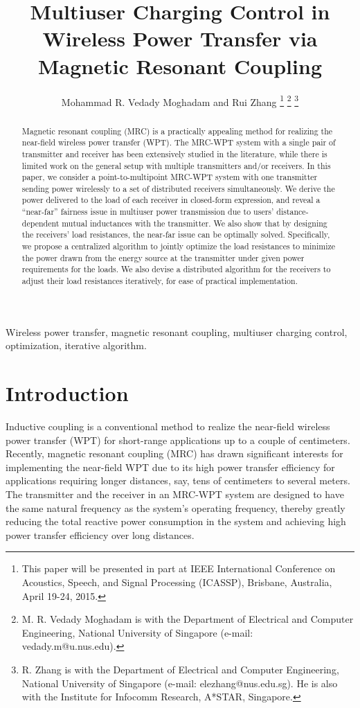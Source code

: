\documentclass[onecolumn, a4size, 11pt]{IEEEtran}
\title{Multiuser Charging Control in Wireless Power Transfer via Magnetic Resonant Coupling}
\author{Mohammad R. Vedady Moghadam and Rui Zhang 
\thanks{This paper will be presented in part at IEEE International Conference on Acoustics, Speech, and Signal Processing (ICASSP), Brisbane,
Australia, April 19-24, 2015.}
\thanks{M. R. Vedady Moghadam is with the Department of Electrical and Computer Engineering, National University of Singapore (e-mail: vedady.m@u.nus.edu).}
\thanks{R. Zhang is with the Department of Electrical and Computer Engineering, National University of Singapore (e-mail: elezhang@nus.edu.sg). He is also with the Institute for Infocomm Research, A*STAR, Singapore.}
}
\begin{document}
\maketitle
\thispagestyle{empty}
\begin{abstract}
Magnetic resonant coupling (MRC) is a practically appealing method for realizing the  near-field  wireless power transfer (WPT). 
The MRC-WPT system with a single pair of transmitter and receiver has been extensively studied in the literature, while there is limited work on  the general  setup  with  multiple  transmitters and/or receivers. 
In this paper, we consider a point-to-multipoint MRC-WPT system with  one transmitter sending  power wirelessly to a set of distributed receivers simultaneously. 
We derive the power delivered to  the load of each receiver in  closed-form expression, and reveal a ``near-far'' fairness issue in multiuser power transmission due to users'  distance-dependent mutual inductances with the transmitter.  
We  also show that by  designing  the receivers' load resistances,   the near-far issue can be optimally solved. 
Specifically,  we propose a centralized algorithm to jointly optimize the load  resistances  to minimize the power drawn from the energy source at the transmitter under  given power requirements  for the loads.  
We also devise a distributed  algorithm for the receivers to adjust their load resistances iteratively, for ease of practical implementation. \end{abstract}
\begin{keywords}
Wireless power transfer, magnetic resonant coupling, multiuser charging control, optimization, iterative algorithm. 
\end{keywords}
\newtheorem{definition}{\underline{Definition}}[section]
\newtheorem{fact}{Fact}
\newtheorem{assumption}{Assumption}
\newtheorem{theorem}{\underline{Theorem}}[section]
\newtheorem{lemma}{\underline{Lemma}}[section]
\newtheorem{property}{\underline{Property}} 
\newtheorem{corollary}{\underline{Corollary}}[section]
\newtheorem{proposition}{\underline{Proposition}}
\newtheorem{example}{\underline{Example}}[section]
\newtheorem{remark}{\underline{Remark}}[section]
\newtheorem{algorithm}{\underline{Algorithm}}[section]
\newcommand{\mv}[1]{\mbox{\boldmath{}}}
\section{Introduction}
\label{sec:introduction}
Inductive coupling  \cite{Murakami, Jang, Brusamarello} is a conventional method to realize the near-field wireless power transfer (WPT) for short-range applications up to a couple of centimeters. 
Recently,  magnetic resonant coupling (MRC) \cite{Kurs, Shin, Chen} has drawn significant interests for implementing the  near-field WPT due to its high  power transfer efficiency for applications requiring longer distances, say,  tens of centimeters to several  meters.  
The transmitter and the receiver  in an MRC-WPT system are designed to have the same natural frequency as the system's operating frequency,  thereby greatly reducing the total  reactive power consumption in the system and achieving high power transfer efficiency over long distances.   
\end{document}
